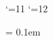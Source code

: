 \let\OriginalGetCaller=\getcaller
\def\getcaller#1#2{%
  \kern0.2em\OriginalGetCaller{#1}{#2}\kern0.4em}

\catcode`\@=11
  \intern@teskip=10pt
\catcode`\@=12

\def\internotepenalty{9999}


\quotekernamount = 0.1em





